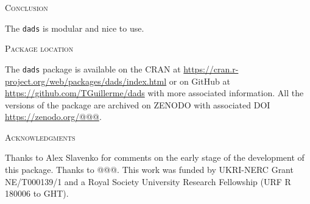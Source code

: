 \documentclass[12pt,letterpaper]{article}
\renewcommand{\section}[1]{%
\bigskip
\begin{center}
\begin{Large}
\normalfont\scshape #1
\medskip
\end{Large}
\end{center}}
\newcommand{\dads}{\texttt{dads} }
\begin{document}
\section{Conclusion}
The \dads is modular and nice to use.

\section{Package location}
The \dads package is available on the CRAN at \url{https://cran.r-project.org/web/packages/dads/index.html} or on GitHub at \url{https://github.com/TGuillerme/dads} with more associated information.
All the versions of the package are archived on ZENODO with associated DOI \url{https://zenodo.org/@@@}.

\section{Acknowledgments}
Thanks to Alex Slavenko for comments on the early stage of the development of this package. Thanks to @@@. This work was funded by UKRI-NERC Grant NE/T000139/1 and a Royal Society University Research Fellowship (URF R 180006 to GHT).



\end{document}
